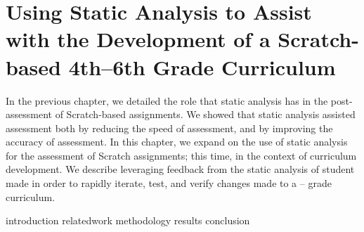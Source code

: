 \chapter{Using Static Analysis to Assist with the Development of a
  Scratch-based 4th--6th Grade Curriculum}
\label{chap:curriculum}

\def\currentprefix{curriculum}

In the previous chapter, we detailed the role that static analysis has in the
post-assessment of Scratch-based assignments. We showed that static analysis
assisted assessment both by reducing the speed of assessment, and by improving
the accuracy of assessment. In this chapter, we expand on the use of static
analysis for the assessment of Scratch assignments; this time, in the context
of curriculum development. We describe leveraging feedback from the static
analysis of student made  in order to rapidly iterate, test, and
verify changes made to a -- grade curriculum.

{introduction}
{relatedwork}
{methodology}
{results}
{conclusion}
